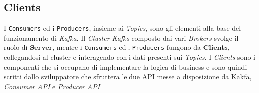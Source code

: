 \newpage
\subsection{Clients}
\label{subsec:kakfa_clients}
I \texttt{Consumers} ed i \texttt{Producers}, insieme ai \textit{Topics}, sono gli elementi alla base del funzionamento di \textit{Kafka}.
Il \textit{Cluster Kafka} composto dai vari \textit{Brokers} svolge il ruolo di \textbf{Server}, mentre i \texttt{Consumers} ed i \texttt{Producers} fungono da \textbf{Clients},
collegandosi al cluster e interagendo con i dati presenti sui \textit{Topics}.
I \textit{Clients} sono i componenti che si occupano di implementare la logica di business e sono quindi scritti dallo sviluppatore che sfruttera le due API messe a disposizione da Kakfa,
\textit{Consumer API} e \textit{Producer API}

